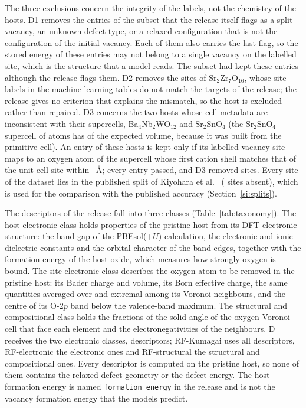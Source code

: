 The three exclusions concern the integrity of the labels, not the chemistry of the hosts. D1 removes the
\numFilterCascadeStepsDOneNRemoved{} entries of the subset that the release itself flags as a split vacancy, an
unknown defect type, or a relaxed configuration that is not the configuration of the initial vacancy. Each of
them also carries the last flag, so the stored energy of these entries may not belong to a single vacancy on the
labelled site, which is the structure that a model reads. The subset had kept these entries although the release
flags them. D2 removes the
\numFilterCascadeStepsDTwoNRemoved{} sites of Sr$_2$Zr$_7$O$_{16}$, whose site labels in the machine-learning
tables do not match the targets of the release; the release gives no criterion that explains the mismatch, so the
host is excluded rather than repaired. D3 concerns the two hosts whose cell metadata are inconsistent with their
supercells, Ba$_4$Nb$_2$WO$_{12}$ and Sr$_2$SnO$_4$ (the Sr$_2$SnO$_4$ supercell of
\numStructureAuditAnomalousHostsSrTwoSnOFourNAtomsSc{} atoms has \numStructureAuditAnomalousHostsSrTwoSnOFourVolumeRatio{}
of the expected volume, because it was built from the primitive cell). An entry of these hosts is kept only if
its labelled vacancy site maps to an oxygen atom of the supercell whose first cation shell matches that of the
unit-cell site within \numFilterCascadeDThreeSrTwoSnOFourSitesOOneToleranceA{}~\AA{}; every entry passed, and D3
removed \numFilterCascadeStepsDThreeNRemoved{} sites. Every site of the dataset lies in the published split of
Kiyohara et al.\ \citep{Kiyohara2025machinelearning} (\numFilterCascadeKiyoharaSplitSitesAbsent{} sites absent),
which is used for the comparison with the published accuracy (Section~\ref{si:splits}).

The descriptors of the release fall into three classes (Table~\ref{tab:taxonomy}). The host-electronic class
holds properties of the pristine host from its DFT electronic structure: the band gap of the PBEsol(+$U$)
calculation, the electronic and ionic dielectric constants and the orbital character of the band edges, together
with the formation energy of the host oxide, which measures how strongly oxygen is bound. The site-electronic class
describes the oxygen atom to be removed in the pristine host: its Bader charge and volume, its Born effective
charge, the same quantities averaged over and extremal among its Voronoi neighbours, and the centre of its
O-2$p$ band below the valence-band maximum. The structural and compositional class holds the fractions of the
solid angle of the oxygen Voronoi cell that face each element and the electronegativities of the neighbours. D
receives the two electronic classes, \numRfElectronicNFeatures{} descriptors; RF-Kumagai uses all
\numRfKumagaiNFeatures{} descriptors, RF-electronic the \numRfElectronicNFeatures{} electronic ones and
RF-structural the \numRfStructuralNFeatures{} structural and compositional ones. Every descriptor is computed on
the pristine host, so none of them contains the relaxed defect geometry or the defect energy. The host formation
energy is named \texttt{formation\_energy} in the release and is not the vacancy formation energy that the models
predict.

{\footnotesize\tighttabs
}
